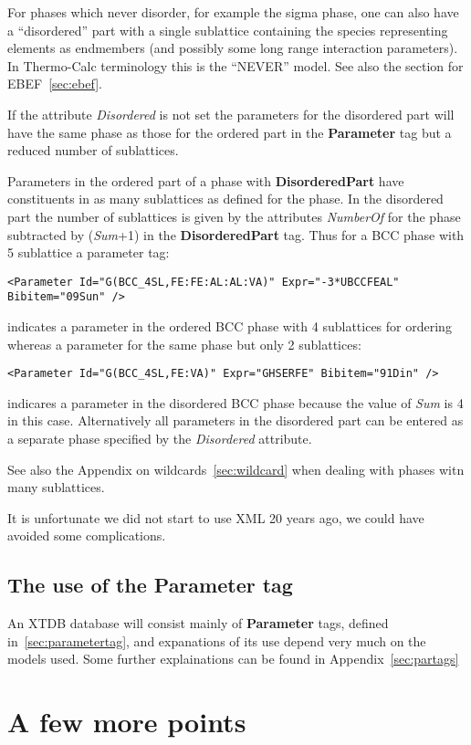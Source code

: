\documentclass{article}
\begin{document}
For phases which never disorder, for example the sigma phase, one can
also have a ``disordered'' part with a single sublattice containing
the species representing elements as endmembers (and possibly some
long range interaction parameters).  In Thermo-Calc terminology this
is the ``NEVER'' model.  See also the section for EBEF~\ref{sec:ebef}.

If the attribute {\em Disordered} is not set the parameters for the
disordered part will have the same phase as those for the ordered part
in the {\bf Parameter} tag but a reduced number of sublattices.

Parameters in the ordered part of a phase with {\bf DisorderedPart}
have constituents in as many sublattices as defined for the phase.  In
the disordered part the number of sublattices is given by the
attributes {\em NumberOf} for the phase subtracted by ({\em Sum}+1) in
the {\bf DisorderedPart} tag.  Thus for a BCC phase with 5 sublattice
a parameter tag:
\begin{verbatim}
<Parameter Id="G(BCC_4SL,FE:FE:AL:AL:VA)" Expr="-3*UBCCFEAL" Bibitem="09Sun" />
\end{verbatim}
indicates a parameter in the ordered BCC phase with 4 sublattices for
ordering whereas a parameter for the same phase but only 2 sublattices:
\begin{verbatim}
<Parameter Id="G(BCC_4SL,FE:VA)" Expr="GHSERFE" Bibitem="91Din" />
\end{verbatim}
indicares a parameter in the disordered BCC phase because the value of
{\em Sum} is 4 in this case.  Alternatively all parameters in the
disordered part can be entered as a separate phase specified by the
{\em Disordered} attribute.

See also the Appendix on wildcards~\ref{sec:wildcard} when dealing
with phases witn many sublattices.

It is unfortunate we did not start to use XML 20 years ago, we could
have avoided some complications.

\subsection{The use of the Parameter tag}

An XTDB database will consist mainly of {\bf Parameter} tags, defined
in~\ref{sec:parametertag}, and expanations of its use depend very much
on the models used.  Some further explainations can be found in
Appendix~\ref{sec:partags}

\section{A few more points}\label{sec:points}
\end{document}
